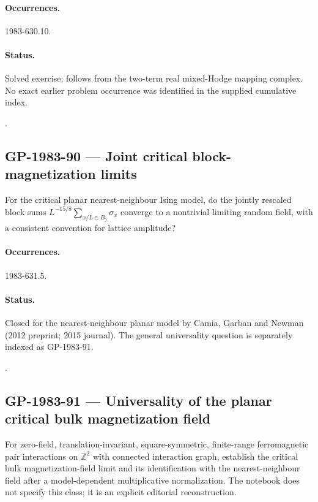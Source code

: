 \paragraph{Occurrences.} 1983-630.10.

\paragraph{Status.} Solved exercise; follows from the two-term real mixed-Hodge mapping complex. No exact earlier problem occurrence was identified in the supplied cumulative index.

\noindent\citep{beilinson1986absolute,bunkenikolaustamme2018regulator}.

\subsection{GP-1983-90 --- Joint critical block-magnetization limits}

\label{problem:GP-1983-90}

For the critical planar nearest-neighbour Ising model, do the jointly rescaled block sums \(L^{-15/8}\sum_{x/L\in B_j}\sigma_x\) converge to a nontrivial limiting random field, with a consistent convention for lattice amplitude?

\paragraph{Occurrences.} 1983-631.5.

\paragraph{Status.} Closed for the nearest-neighbour planar model by Camia, Garban and Newman (2012 preprint; 2015 journal). The general universality question is separately indexed as GP-1983-91.

\noindent\citep{camia2015magnetization}.

\subsection{GP-1983-91 --- Universality of the planar critical bulk magnetization field}

\label{problem:GP-1983-91}

For zero-field, translation-invariant, square-symmetric, finite-range ferromagnetic pair interactions on \(\mathbb Z^2\) with connected interaction graph, establish the critical bulk magnetization-field limit and its identification with the nearest-neighbour field after a model-dependent multiplicative normalization. The notebook does not specify this class; it is an explicit editorial reconstruction.

